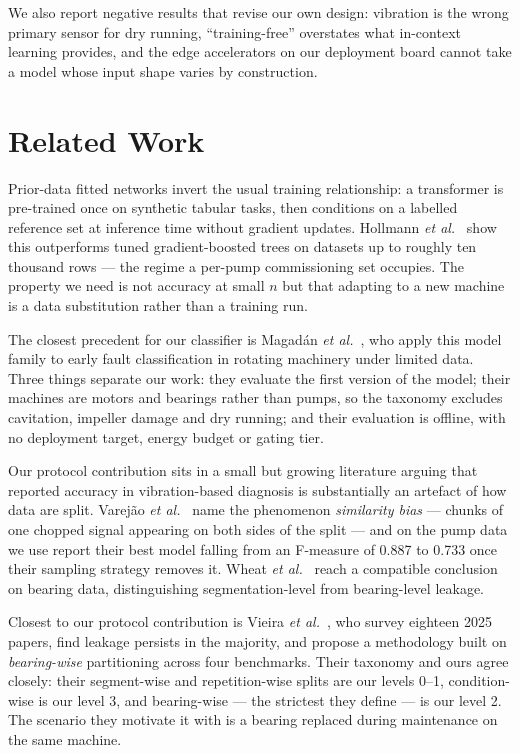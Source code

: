 \documentclass[conference,a4paper,10pt]{IEEEtran}
\begin{document}
We also report negative results that revise our own design: vibration is the wrong
primary sensor for dry running, ``training-free'' overstates what in-context
learning provides, and the edge accelerators on our deployment board cannot take a
model whose input shape varies by construction.

\section{Related Work}
Prior-data fitted networks invert the usual training relationship: a transformer
is pre-trained once on synthetic tabular tasks, then conditions on a labelled
reference set at inference time without gradient updates. Hollmann
\emph{et al.}~\cite{hollmann2025} show this outperforms tuned gradient-boosted
trees on datasets up to roughly ten thousand rows --- the regime a per-pump
commissioning set occupies. The property we need is not accuracy at small $n$ but
that adapting to a new machine is a data substitution rather than a training run.

The closest precedent for our classifier is Magad\'an \emph{et al.}~\cite{magadan2023},
who apply this model family to early fault classification in rotating machinery
under limited data. Three things separate our work: they evaluate the first
version of the model; their machines are motors and bearings rather than pumps,
so the taxonomy excludes cavitation, impeller damage and dry running; and their
evaluation is offline, with no deployment target, energy budget or gating tier.

Our protocol contribution sits in a small but growing literature arguing that
reported accuracy in vibration-based diagnosis is substantially an artefact of
how data are split. Varej\~ao \emph{et al.}~\cite{varejao2024} name the
phenomenon \emph{similarity bias} --- chunks of one chopped signal appearing on
both sides of the split --- and on the pump data we use report their best model
falling from an F-measure of 0.887 to 0.733 once their sampling strategy removes
it. Wheat \emph{et al.}~\cite{wheat2024} reach a compatible conclusion on bearing
data, distinguishing segmentation-level from bearing-level leakage.

Closest to our protocol contribution is Vieira \emph{et al.}~\cite{vieira2025},
who survey eighteen 2025 papers, find leakage persists in the majority, and
propose a methodology built on \emph{bearing-wise} partitioning across four
benchmarks. Their taxonomy and ours agree closely: their segment-wise and
repetition-wise splits are our levels 0--1, condition-wise is our level 3, and
bearing-wise --- the strictest they define --- is our level 2. The scenario they
motivate it with is a bearing replaced during maintenance on the same machine.
\end{document}
